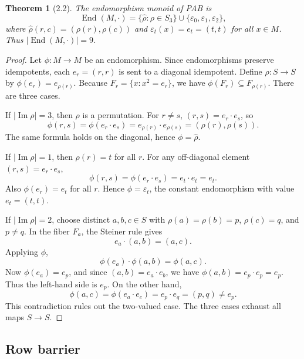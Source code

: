 \documentclass[11pt]{article}
\newtheorem*{theoremstar}{Theorem}
\begin{document}
\begin{theoremstar}[2.2]
The endomorphism monoid of PAB is
\[
\operatorname{End}(M,\cdot)=\{\widehat\rho:\rho\in S_3\}\cup\{\varepsilon_0,\varepsilon_1,\varepsilon_2\},
\]
where \(\widehat\rho(r,c)=(\rho(r),\rho(c))\) and \(\varepsilon_t(x)=e_t=(t,t)\)
for all \(x\in M\). Thus \(|\operatorname{End}(M,\cdot)|=9\).

\end{theoremstar}
\begin{proof}
Let \(\phi:M\to M\) be an endomorphism. Since endomorphisms preserve
idempotents, each \(e_r=(r,r)\) is sent to a diagonal idempotent. Define
\(\rho:S\to S\) by \(\phi(e_r)=e_{\rho(r)}\). Because
\(F_r=\{x:x^2=e_r\}\), we have \(\phi(F_r)\subseteq F_{\rho(r)}\). There are three
cases.

If \(|\operatorname{Im}\rho|=3\), then \(\rho\) is a permutation. For \(r\ne s\),
\((r,s)=e_r\cdot e_s\), so
\[
\phi(r,s)=\phi(e_r\cdot e_s)=e_{\rho(r)}\cdot e_{\rho(s)}=(\rho(r),\rho(s)).
\]
The same formula holds on the diagonal, hence \(\phi=\widehat\rho\).

If \(|\operatorname{Im}\rho|=1\), then \(\rho(r)=t\) for all \(r\). For any
off-diagonal element \((r,s)=e_r\cdot e_s\),
\[
\phi(r,s)=\phi(e_r\cdot e_s)=e_t\cdot e_t=e_t.
\]
Also \(\phi(e_r)=e_t\) for all \(r\). Hence \(\phi=\varepsilon_t\), the constant
endomorphism with value \(e_t=(t,t)\).

If \(|\operatorname{Im}\rho|=2\), choose distinct \(a,b,c\in S\) with
\(\rho(a)=\rho(b)=p\), \(\rho(c)=q\), and \(p\ne q\). In the fiber \(F_a\), the
Steiner rule gives
\[
e_a\cdot(a,b)=(a,c).
\]
Applying \(\phi\),
\[
\phi(e_a)\cdot\phi(a,b)=\phi(a,c).
\]
Now \(\phi(e_a)=e_p\), and since \((a,b)=e_a\cdot e_b\), we have
\(\phi(a,b)=e_p\cdot e_p=e_p\). Thus the left-hand side is \(e_p\). On the other
hand,
\[
\phi(a,c)=\phi(e_a\cdot e_c)=e_p\cdot e_q=(p,q)\ne e_p.
\]
This contradiction rules out the two-valued case. The three cases exhaust all
maps \(S\to S\).

\end{proof}
\subsection{Row barrier}
\end{document}
